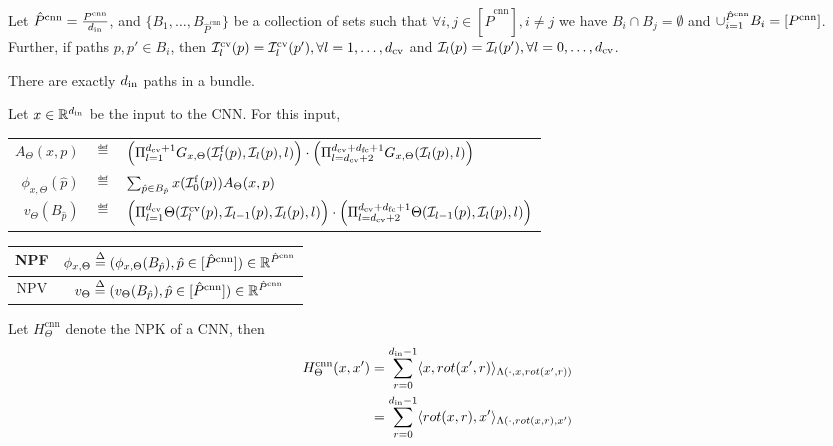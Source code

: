 \begin{definition}\label{def:bundle}
Let $\hat{P}^{\text{cnn}}=\frac{P^{\text{cnn}}}{d_{\text{in}}}$, and $\{B_1,\ldots, B_{\hat{P}^{\text{cnn}}}\}$ be a collection of sets such that $\forall i,j\in [\hat{P}^{\text{cnn}}], i\neq j$ we have $B_i\cap B_j=\emptyset$ and $\cup_{i=1}^{\hat{P}^{\text{cnn}}}B_i =[P^{\text{cnn}}]$. Further,  if paths $p,p' \in B_i$, then $\mathcal{I}^{\text{cv}}_l(p)=\mathcal{I}^{\text{cv}}_l(p'), \forall l=1,\ldots, d_{\text{cv}}$ and $\mathcal{I}_l(p)=\mathcal{I}_l(p'), \forall l=0,\ldots, d_{\text{cv}}$.
\end{definition}

\begin{proposition}\label{prop:bundle}
There are exactly $d_{\text{in}}$ paths in a bundle.
\end{proposition}

\begin{definition}\label{def:convnps} Let $x\in\mathbb{R}^{d_{\text{in}}}$ be the input to the CNN. For this input, 
\begin{tabular}{rlp{12cm}}
$A_{\Theta}(x,p)$&$\eqdef$&$\left(\Pi_{l=1}^{d_{\text{cv}}+1} G_{x,\Theta}(\mathcal{I}^{\text{f}}_l(p),\mathcal{I}_l(p),l)\right)\cdot\left(\Pi_{l=d_{\text{cv}}+2}^{d_{\text{cv}}+d_{\text{fc}}+1} G_{x,\Theta}(\mathcal{I}_l(p),l)\right)$\\
$\phi_{x,\Theta}(\hat{p})$&$\eqdef$&$ \sum_{\hat{p}\in B_{\hat{p}}}x(\mathcal{I}^{\text{f}}_0(p))A_{\Theta}(x,p)$\\
$v_{\Theta}(B_{\hat{p}})$&$\eqdef$&$ \left(\Pi_{l=1}^{d_{\text{cv}}} \Theta(\mathcal{I}^{\text{cv}}_{l}(p),\mathcal{I}_{l-1}(p),\mathcal{I}_{l}(p),l)\right) \cdot\left( \Pi_{l=d_{\text{cv}}+2}^{d_{\text{cv}}+d_{\text{fc}}+1} \Theta(\mathcal{I}_{l-1}(p),\mathcal{I}_l(p),l)\right)$ 
\end{tabular}
\begin{center}
\begin{tabular}{|c|c|}\hline
NPF &$\phi_{x,\Theta}\stackrel{\Delta}{=} (\phi_{x,\Theta}(B_{\hat{p}}),\hat{p}\in [\hat{P}^{\text{cnn}}])\in\mathbb{R}^{\hat{P}^{\text{cnn}}}$\\\hline
NPV& $v_{\Theta}\stackrel{\Delta}{=} (v_{\Theta}(B_{\hat{p}}),\hat{p}\in [\hat{P}^{\text{cnn}}])\in\mathbb{R}^{\hat{P}^{\text{cnn}}}$\\\hline
\end{tabular}
\end{center}
\end{definition}



\begin{lemma}\label{lm:cnnnpk}
Let $H^{\text{cnn}}_{\Theta}$ denote the NPK of a CNN, then 
\begin{align*}
H^{\text{cnn}}_{\Theta}(x,x')&=\sum_{r=0}^{d_{\text{in}}-1} \langle x,rot(x',r)\rangle_{\Lambda(\cdot, x,rot(x',r))}\\&=\sum_{r=0}^{d_{\text{in}}-1} \langle rot(x,r),x'\rangle_{\Lambda(\cdot, rot(x,r),x')}
\end{align*}
\end{lemma}

